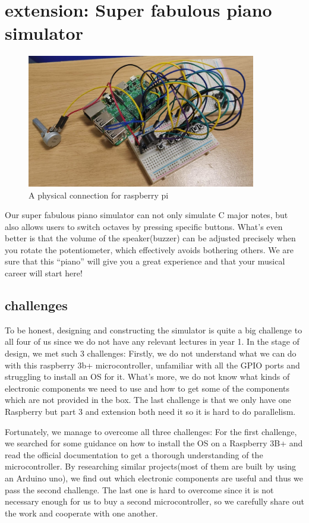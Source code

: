 \documentclass[11pt]{article}
\begin{document}
\section{extension: Super fabulous piano simulator}

\begin{figure}[H]
	\centering
	\includegraphics[width=10cm]{src/extension.png}
	\caption{A physical connection for raspberry pi}
	\label{fig:extension}
\end{figure}


Our super fabulous piano simulator can not only simulate C major notes, but also allows users to switch octaves by pressing specific buttons. What’s even better is that the volume of the speaker(buzzer) can be adjusted precisely when you rotate the potentiometer, which effectively avoids bothering others.
We are sure that this “piano” will give you a great experience and that your musical career will start here!

\subsection{challenges}

To be honest, designing and constructing the simulator is quite a big challenge to all four of us since we do not have any relevant lectures in year 1. 
In the stage of design, we met such 3 challenges:
Firstly, we do not understand what we can do with this raspberry 3b+ microcontroller, unfamiliar with all the GPIO ports and struggling to install an OS for it. What’s more, we do not know what kinds of electronic components we need to use and how to get some of the components which are not provided in the box. The last challenge is that we only have one Raspberry but part 3 and extension both need it so it is hard to do parallelism.

Fortunately, we manage to overcome all three challenges:
For the first challenge, we searched for some guidance on how to install the OS on a Raspberry 3B+ and read the official documentation to get a thorough understanding of the microcontroller. By researching similar projects(most of them are built by using an Arduino uno), we find out which electronic components are useful and thus we pass the second challenge. The last one is hard to overcome since it is not necessary enough for us to buy a second microcontroller, so we carefully share out the work and cooperate with one another.
\end{document}

